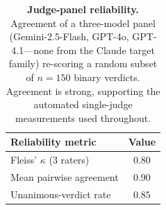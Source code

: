 \begin{table}[t]
\centering
\small
\setlength{\tabcolsep}{8pt}
\renewcommand{\arraystretch}{1.15}
\caption{\textbf{Judge-panel reliability.} Agreement of a three-model panel (Gemini-2.5-Flash,
GPT-4o, GPT-4.1---none from the Claude target family) re-scoring a random subset of $n{=}150$ binary
verdicts. Agreement is strong, supporting the automated single-judge measurements used throughout.}
\label{tab:judges}
\begin{tabular}{@{}l c@{}}
\toprule
\textbf{Reliability metric} & \textbf{Value} \\
\midrule
Fleiss' $\kappa$ (3 raters)     & $0.80$ \\
Mean pairwise agreement         & $0.90$ \\
Unanimous-verdict rate          & $0.85$ \\
\bottomrule
\end{tabular}
\end{table}
